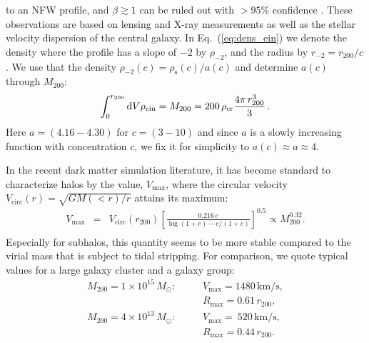 \documentclass[10pt,aps,pra,reprint,amsmath,amsfonts,amssymb,showpacs,nofootinbib,floatfix]{revtex4-1}
\newcommand{\rmn}{\mathrm}
\newcommand{\msun}{M_\odot}
\newcommand{\s}{\rmn{s}}
\newcommand{\dd}{\rmn{d}}
\newcommand{\rvir}{r_{200}}
\newcommand{\mvir}{M_{200}}
\begin{document}
to an NFW profile, and $\beta\gtrsim 1$ can be ruled out with $>95$\%
confidence \cite{2011ApJ...728L..39N}. These observations are based on
lensing and X-ray measurements as well as the stellar velocity
dispersion of the central galaxy. In Eq.~(\ref{eq:dens_ein}) we denote
the density where the profile has a slope of $-2$ by $\rho_{-2}$, and
the radius by $r_{-2}=\rvir/c$. We use that the density
$\rho_{-2}(c)=\rho_\s(c)/a(c)$ and determine $a(c)$ through $\mvir$:
\begin{equation}
\int_0^{\rvir}\dd V \rho_{\rm ein} = \mvir = 
200\,\rho_{\rmn{cr}} \frac{4\pi\,\rvir^3}{3} \,.
\end{equation}
Here $a=(4.16-4.30)$ for $c=(3-10)$ and since $a$ is a slowly
increasing function with concentration $c$, we fix it for simplicity
to $a(c)\approx a \approx 4$.

In the recent dark matter simulation literature, it has become
standard to characterize halos by the value, $V_\rmn{max}$, where the
circular velocity $V_\rmn{circ}(r)=\sqrt{GM(<r)/r}$ attains its
maximum:
\begin{eqnarray}
V_\rmn{max} &=& V_\rmn{circ}(\rvir) 
\left[\frac{0.216\,c}{\log(1+c)-c/(1+c)}\right]^{0.5}\propto \mvir^{0.32}.\nonumber\\
\end{eqnarray}
Especially for subhalos, this quantity seems to be more stable
compared to the virial mass that is subject to tidal stripping. For
comparison, we quote typical values for a large galaxy cluster and a galaxy group:
\begin{eqnarray}
M_{200} = 1\times10^{15}\,\msun:\quad &&V_\rmn{max}=1480\,\rmn{km/s}, \nonumber\\
                                     &&R_\rmn{max}=0.61\,\rvir, \\
M_{200} = 4\times10^{13}\,\msun:\quad &&V_\rmn{max}=~520\,\rmn{km/s}, \nonumber\\
                                     &&R_\rmn{max}=0.44\,\rvir.
\end{eqnarray}
\end{document}
